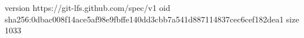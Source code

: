 version https://git-lfs.github.com/spec/v1
oid sha256:0dbac008f14ace5af98e9fbffe140dd3cbb7a541d887114837cec6cef182dea1
size 1033

